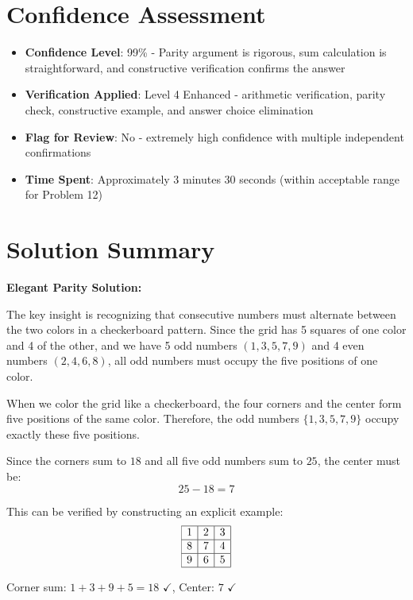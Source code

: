 \documentclass[11pt]{article}
\begin{document}
\section*{Confidence Assessment}
\begin{itemize}[leftmargin=*]
    \item \textbf{Confidence Level}: 99\% - Parity argument is rigorous, sum calculation is straightforward, and constructive verification confirms the answer
    \item \textbf{Verification Applied}: Level 4 Enhanced - arithmetic verification, parity check, constructive example, and answer choice elimination
    \item \textbf{Flag for Review}: No - extremely high confidence with multiple independent confirmations
    \item \textbf{Time Spent}: Approximately 3 minutes 30 seconds (within acceptable range for Problem 12)
\end{itemize}

\section*{Solution Summary}

\textbf{Elegant Parity Solution:}

The key insight is recognizing that consecutive numbers must alternate between the two colors in a checkerboard pattern. Since the grid has 5 squares of one color and 4 of the other, and we have 5 odd numbers $(1,3,5,7,9)$ and 4 even numbers $(2,4,6,8)$, all odd numbers must occupy the five positions of one color.

When we color the grid like a checkerboard, the four corners and the center form five positions of the same color. Therefore, the odd numbers $\{1,3,5,7,9\}$ occupy exactly these five positions.

Since the corners sum to $18$ and all five odd numbers sum to $25$, the center must be:
$$25 - 18 = 7$$

This can be verified by constructing an explicit example:
$$\begin{array}{|c|c|c|}
\hline
1 & 2 & 3 \\
\hline
8 & 7 & 4 \\
\hline
9 & 6 & 5 \\
\hline
\end{array}$$

Corner sum: $1+3+9+5=18$ $\checkmark$, Center: $7$ $\checkmark$
\end{document}
